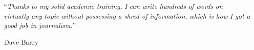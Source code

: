 \vspace*{0.2\textheight}

\noindent\enquote{\itshape Thanks to my solid academic training, I can write hundreds of words on virtually any topic without possessing a shred of information, which is how I got a good job in journalism.}\bigbreak

\hfill Dave Barry